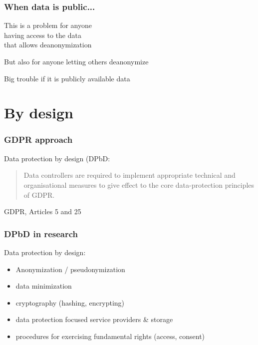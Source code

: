 \documentclass[17pt,aspectratio=169,hyperref={pdfusetitle,colorlinks,allcolors=olive}]{beamer}
\begin{document}
\begin{frame}[fragile]
  \frametitle{When data is public...}

  This is a problem for anyone \\
  having access to the data \\
  that allows deanonymization \\

  \vspace{.5cm}
  
  But also for anyone letting others deanonymize \\

  \vspace{.5cm}
  
  Big trouble if it is publicly available data \\
  
\end{frame}


\section{By design}

\begin{frame}[fragile]
  \frametitle{GDPR approach}

  Data protection by design (DPbD:\\

  \vspace{.5cm}
  \begin{quote}
    Data  controllers are required  to  implement appropriate technical and organisational measures to give effect to the core data-protection principles of GDPR.
  \end{quote}

  \begin{flushright}
  GDPR, Articles 5 and 25
  \end{flushright}
  
\end{frame}

\begin{frame}[fragile]
  \frametitle{DPbD in research}

  Data protection by design:\\

  \begin{itemize}
  \item Anonymization / pseudonymization
  \item data minimization
  \item cryptography (hashing, encrypting)
  \item data protection focused service providers \& storage
  \item procedures for exercising fundamental rights (access, consent)
  \end{itemize}
  
\end{frame}
\end{document}
